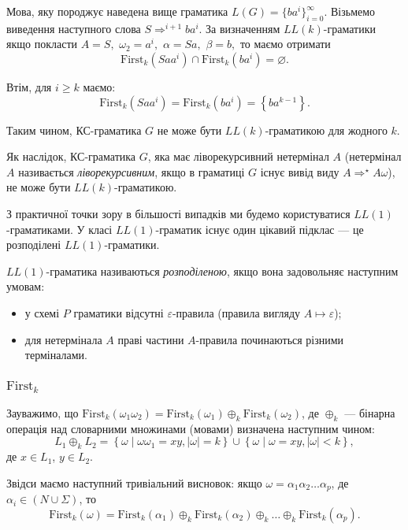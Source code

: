 Мова, яку породжує наведена вище граматика $L(G) = \{ ba^i \}_{i = 0}^\infty$. Візьмемо виведення наступного слова $S \Rightarrow^{i+1} b a^i$. За визначенням $LL(k)$-граматики якщо покласти $A = S,$ $\omega_2 = a^i,$ $\alpha = S a,$ $\beta = b,$ то маємо отримати
\[\text{First}_k \left(S a a^i\right) \cap \text{First}_k \left(b a^i\right) = \varnothing.\]

Втім, для $i \ge k$ маємо:\[\text{First}_k \left(S a a^i\right) = \text{First}_k \left(b a^i\right) = \left\{b a^{k - 1}\right\}.\]

Таким чином, КС-граматика $G$ не може бути $LL(k)$-граматикою для жодного $k$. \medskip

Як наслідок, КС-граматика $G$, яка має ліворекурсивний нетермінал $A$ (нетермінал $A$ називається \textit{ліворекурсивним}, якщо в граматиці $G$ існує вивід виду $A \Rightarrow^\star A \omega$), не може бути $LL(k)$-граматикою. \medskip

З практичної точки зору в більшості випадків ми будемо користуватися $LL(1)$-граматиками. У класі $LL(1)$-граматик існує один цікавий підклас --- це розподілені $LL(1)$-граматики. \medskip

$LL(1)$-граматика називаються \textit{розподіленою}, якщо вона задовольняє наступним умовам:
\begin{itemize}
	\item у схемі $P$ граматики відсутні $\varepsilon$-правила (правила вигляду $A \mapsto \varepsilon$);
	\item для нетермінала $A$ праві частини $A$-правила починаються різними терміналами.
\end{itemize}

\subsubsection{\texorpdfstring{$\text{First}_k$}{Firstk}}

Зауважимо, що $\text{First}_k (\omega_1 \omega_2) = \text{First}_k (\omega_1) \oplus_k \text{First}_k (\omega_2)$, де $\oplus_k$ --- бінарна операція над словарними множинами (мовами) визначена наступним чином:
\begin{equation}
	L_1 \oplus_k L_2 = \left\{ \omega \mid \omega \omega_1 = x y, \vert\omega\vert = k \right\} \cup  \left\{ \omega \mid \omega = x y, \vert\omega\vert < k \right\},
\end{equation}
де $x \in L_1$, $y \in L_2$. \medskip

Звідси маємо наступний тривіальний висновок: якщо $\omega = \alpha_1 \alpha_2 \ldots \alpha_p$, де $\alpha_i \in (N \cup \Sigma)$, то
\begin{equation}
	\text{First}_k (\omega) = \text{First}_k (\alpha_1) \oplus_k \text{First}_k (\alpha_2) \oplus_k \ldots \oplus_k \text{First}_k (\alpha_p).
\end{equation}

